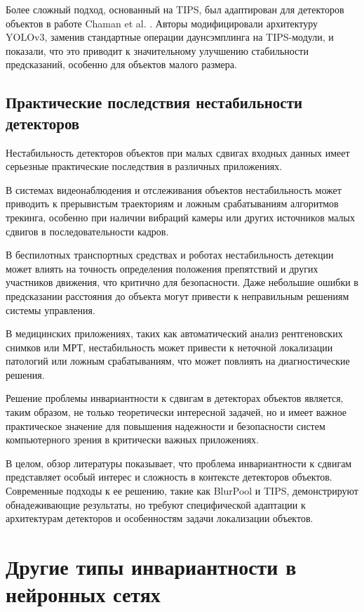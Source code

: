 Более сложный подход, основанный на TIPS, был адаптирован для детекторов объектов в работе Chaman et al. \cite{Chaman2022}. Авторы модифицировали архитектуру YOLOv3, заменив стандартные операции даунсэмплинга на TIPS-модули, и показали, что это приводит к значительному улучшению стабильности предсказаний, особенно для объектов малого размера.

\subsection{Практические последствия нестабильности детекторов}
\label{review:detectors:implications}

Нестабильность детекторов объектов при малых сдвигах входных данных имеет серьезные практические последствия в различных приложениях.

В системах видеонаблюдения и отслеживания объектов нестабильность может приводить к прерывистым траекториям и ложным срабатываниям алгоритмов трекинга, особенно при наличии вибраций камеры или других источников малых сдвигов в последовательности кадров.

В беспилотных транспортных средствах и роботах нестабильность детекции может влиять на точность определения положения препятствий и других участников движения, что критично для безопасности. Даже небольшие ошибки в предсказании расстояния до объекта могут привести к неправильным решениям системы управления.

В медицинских приложениях, таких как автоматический анализ рентгеновских снимков или МРТ, нестабильность может привести к неточной локализации патологий или ложным срабатываниям, что может повлиять на диагностические решения.

Решение проблемы инвариантности к сдвигам в детекторах объектов является, таким образом, не только теоретически интересной задачей, но и имеет важное практическое значение для повышения надежности и безопасности систем компьютерного зрения в критически важных приложениях.

В целом, обзор литературы показывает, что проблема инвариантности к сдвигам представляет особый интерес и сложность в контексте детекторов объектов. Современные подходы к ее решению, такие как BlurPool и TIPS, демонстрируют обнадеживающие результаты, но требуют специфической адаптации к архитектурам детекторов и особенностям задачи локализации объектов.

\section{Другие типы инвариантности в нейронных сетях}
\label{review:other_invariance}

